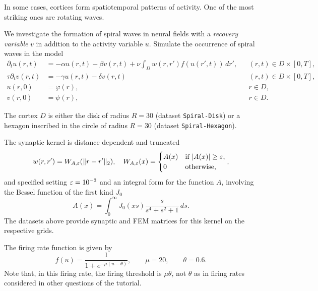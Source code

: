 \documentclass[a4paper]{siamonline220329}
\theoremstyle{plain}
\begin{document}
\begin{question}\label{question:spiral}
  In some cases, cortices form spatiotemporal patterns of activity.
  One of the most striking ones are rotating waves. 

  We investigate the formation of spiral waves in neural fields with a \textit{recovery variable}
  $v$ in addition to the activity variable $u$. Simulate the occurrence of spiral
  waves in the model
 \begin{equation*}
   \begin{aligned}
     \partial_{t} u(r,t) & = -\alpha u(r,t) -\beta v(r,t) + \nu \int_{D} w(r,r')
     f(u(r',t))\,d r',
       && (r,t) \in D \times [0,T], \\
     \tau \partial_{t} v(r,t) & = -\gamma u(r,t) -\delta v(r,t) 
       && (r,t) \in D \times [0,T], \\
     u(r,0) & = \varphi(r),
       && r \in D, \\
     v(r,0) & = \psi(r),
       && r \in D.
   \end{aligned}
 \end{equation*}

  The cortex $D$ is either the disk of radius $R = 30$ (dataset
  \lstinline|Spiral-Disk|) or a hexagon inscribed in the circle of radius $R=30$
  (dataset \lstinline|Spiral-Hexagon|).

  The synaptic kernel is distance dependent and truncated
  \[
    w(r,r') = W_{A,\varepsilon}(\| r - r' \|_2), 
    \quad 
    W_{A,\varepsilon}(x) = 
    \begin{cases}
      A(x) & \text{if $|A(x)|  \geq \varepsilon $,} \\
      0    & \text{otherwise,} 
    \end{cases},
  \]
  and specified setting $\varepsilon=10^{-3}$ and an integral form for the function $A$,
  involving the Bessel function of the first kind $J_0$
  \[
   A(x) = \int_{0}^{\infty} J_0(xs) \frac{s}{s^4+s^2+1}\,d s.
  \]
  The datasets above provide synaptic and FEM matrices for this kernel on the
  respective grids.

  The firing rate function is given by
  \[
  f(u) = \frac{1}{1+e^{-\mu(u-\theta)}},  \qquad \mu =20, \qquad \theta = 0.6.
  \]
  Note that, in this firing rate, the firing threshold is $\mu \theta$, not $\theta$ as
  in firing rates considered in other questions of the tutorial.


\end{question}
\end{document}
